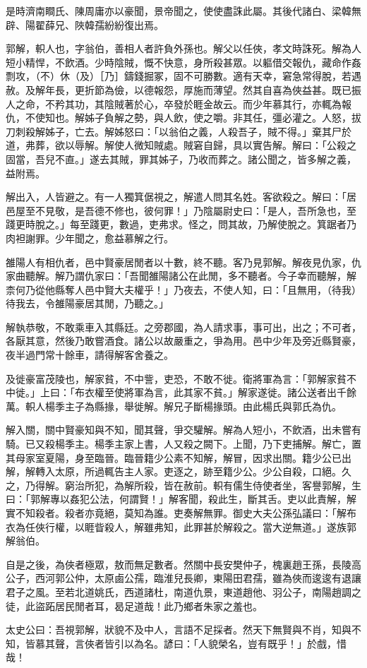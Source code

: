 \begin{pinyinscope}
是時濟南瞷氏、陳周庸亦以豪聞，景帝聞之，使使盡誅此屬。其後代諸白、梁韓無辟、陽翟薛兄、陜韓孺紛紛復出焉。

郭解，軹人也，字翁伯，善相人者許負外孫也。解父以任俠，孝文時誅死。解為人短小精悍，不飲酒。少時陰賊，慨不快意，身所殺甚眾。以軀借交報仇，藏命作姦剽攻，（不）休（及）［乃］鑄錢掘冢，固不可勝數。適有天幸，窘急常得脫，若遇赦。及解年長，更折節為儉，以德報怨，厚施而薄望。然其自喜為俠益甚。既已振人之命，不矜其功，其陰賊著於心，卒發於睚金故云。而少年慕其行，亦輒為報仇，不使知也。解姊子負解之勢，與人飲，使之嚼。非其任，彊必灌之。人怒，拔刀刺殺解姊子，亡去。解姊怒曰：「以翁伯之義，人殺吾子，賊不得。」棄其尸於道，弗葬，欲以辱解。解使人微知賊處。賊窘自歸，具以實告解。解曰：「公殺之固當，吾兒不直。」遂去其賊，罪其姊子，乃收而葬之。諸公聞之，皆多解之義，益附焉。

解出入，人皆避之。有一人獨箕倨視之，解遣人問其名姓。客欲殺之。解曰：「居邑屋至不見敬，是吾德不修也，彼何罪！」乃陰屬尉史曰：「是人，吾所急也，至踐更時脫之。」每至踐更，數過，吏弗求。怪之，問其故，乃解使脫之。箕踞者乃肉袒謝罪。少年聞之，愈益慕解之行。

雒陽人有相仇者，邑中賢豪居閒者以十數，終不聽。客乃見郭解。解夜見仇家，仇家曲聽解。解乃謂仇家曰：「吾聞雒陽諸公在此閒，多不聽者。今子幸而聽解，解柰何乃從他縣奪人邑中賢大夫權乎！」乃夜去，不使人知，曰：「且無用，（待我）待我去，令雒陽豪居其閒，乃聽之。」

解執恭敬，不敢乘車入其縣廷。之旁郡國，為人請求事，事可出，出之；不可者，各厭其意，然後乃敢嘗酒食。諸公以故嚴重之，爭為用。邑中少年及旁近縣賢豪，夜半過門常十餘車，請得解客舍養之。

及徙豪富茂陵也，解家貧，不中訾，吏恐，不敢不徙。衛將軍為言：「郭解家貧不中徙。」上曰：「布衣權至使將軍為言，此其家不貧。」解家遂徙。諸公送者出千餘萬。軹人楊季主子為縣掾，舉徙解。解兄子斷楊掾頭。由此楊氏與郭氏為仇。

解入關，關中賢豪知與不知，聞其聲，爭交驩解。解為人短小，不飲酒，出未嘗有騎。已又殺楊季主。楊季主家上書，人又殺之闕下。上聞，乃下吏捕解。解亡，置其母家室夏陽，身至臨晉。臨晉籍少公素不知解，解冒，因求出關。籍少公已出解，解轉入太原，所過輒告主人家。吏逐之，跡至籍少公。少公自殺，口絕。久之，乃得解。窮治所犯，為解所殺，皆在赦前。軹有儒生侍使者坐，客譽郭解，生曰：「郭解專以姦犯公法，何謂賢！」解客聞，殺此生，斷其舌。吏以此責解，解實不知殺者。殺者亦竟絕，莫知為誰。吏奏解無罪。御史大夫公孫弘議曰：「解布衣為任俠行權，以睚眥殺人，解雖弗知，此罪甚於解殺之。當大逆無道。」遂族郭解翁伯。

自是之後，為俠者極眾，敖而無足數者。然關中長安樊仲子，槐裏趙王孫，長陵高公子，西河郭公仲，太原鹵公孺，臨淮兒長卿，東陽田君孺，雖為俠而逡逡有退讓君子之風。至若北道姚氏，西道諸杜，南道仇景，東道趙他、羽公子，南陽趙調之徒，此盜跖居民閒者耳，曷足道哉！此乃鄉者朱家之羞也。

太史公曰：吾視郭解，狀貌不及中人，言語不足採者。然天下無賢與不肖，知與不知，皆慕其聲，言俠者皆引以為名。諺曰：「人貌榮名，豈有既乎！」於戲，惜哉！


\end{pinyinscope}